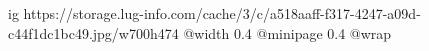  
 
 
 
 

\ifcmt
  ig https://storage.lug-info.com/cache/3/c/a518aaff-f317-4247-a09d-c44f1dc1bc49.jpg/w700h474
  @width 0.4
  @minipage 0.4
  @wrap \parpic[r]
\fi
